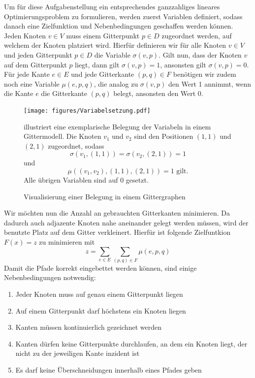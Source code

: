 \documentclass[bachelor, german]{algothesis}
\begin{document}
Um für diese Aufgabenstellung ein entsprechendes ganzzahliges lineares Optimierungsproblem zu formulieren, werden zuerst Variablen definiert, sodass danach eine Zielfunktion und Nebenbedingungen geschaffen werden können. \newline
Jeden Knoten $v \in V$ muss einem Gitterpunkt $p \in D$ zugeordnet werden, auf welchem der Knoten platziert wird. Hierfür definieren wir für alle Knoten $v \in V$ und jeden Gitterpunkt $p \in D$ die Variable $\sigma(v,p)$. Gilt nun, dass der Knoten $v$ auf dem Gitterpunkt $p$ liegt, dann gilt $\sigma(v,p) = 1$, ansonsten gilt $\sigma(v,p) = 0$.  \newline
Für jede Kante $e \in E$ und jede Gitterkante $(p,q) \in F$ benötigen wir zudem noch eine Variable $\mu(e,p,q)$, die analog zu $\sigma(v,p)$ den Wert 1 annimmt, wenn die Kante $e$ die Gitterkante $(p,q)$ belegt, ansonsten den Wert 0.\newline
\begin{figure}[H]
    \begin{minipage}{0.45\textwidth}
    \centering
    \texttt{[image: figures/Variabelsetzung.pdf]}
    \caption{Visualisierung einer Belegung in einem Gittergraphen}
    \label{fig:Var_Example}
    \end{minipage}
    \begin{minipage}{0.5\textwidth}
    \small
     illustriert eine exemplarische Belegung der Variabeln in einem Gittermodell. Die Knoten $v_1$ und $v_2$ sind den Positionen $(1,1)$ und $(2,1)$ zugeordnet, sodass $$\sigma(v_1,(1,1))=\sigma(v_2,(2,1))=1$$ und $$\mu((v_1,v_2),(1,1),(2,1))=1 \text{ gilt.}$$ Alle übrigen Variablen sind auf $0$ gesetzt.
    \end{minipage}
\end{figure}
Wir möchten nun die Anzahl an gebrauchten Gitterkanten minimieren. Da dadurch auch adjazente Knoten nahe aneinander gelegt werden müssen, wird der benutzte Platz auf dem Gitter verkleinert. Hierfür ist folgende Zielfuntkion $F(x) = z$  zu minimieren mit $$z = \sum_{e \in E} \sum_{(p,q) \in F} \mu(e,p,q)$$
Damit die Pfade korrekt eingebettet werden können, sind einige Nebenbedingungen notwendig:
\begin{enumerate}[(1)]
    \item  Jeder Knoten muss auf genau einem Gitterpunkt liegen
    \item Auf einem Gitterpunkt darf höchstens ein Knoten liegen
    \item Kanten müssen kontinuierlich gezeichnet werden
    \item Kanten dürfen keine Gitterpunkte durchlaufen, an dem ein Knoten liegt, der nicht zu der jeweiligen Kante inzident ist
    \item Es darf keine Überschneidungen innerhalb eines Pfades geben
\end{enumerate}
\end{document}
